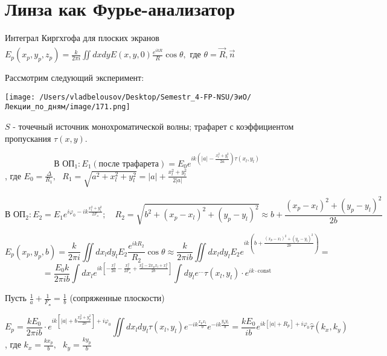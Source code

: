 \documentclass[12pt, a4paper]{report}
\begin{document}
\fi


\section{Линза как Фурье-анализатор}

Интеграл Киргхгофа для плоских экранов \( \displaystyle  E_p (x_p , y_p , z_p ) = \frac{k}{ 2 \pi i } \iint dx dy E(x, y , 0 ) \frac{e^{ i k R } }{R } \cos  \theta  ,    \) \( \text{где } \theta = \widehat{\vec{R }  ,\vec{n } }  \) 

Рассмотрим следующий эксперимент: 

\begin{center}
    \texttt{[image: /Users/vladbelousov/Desktop/Semestr\_4-FP-NSU/ЭиО/Лекции\_по\_дням/image/171.png]}
\end{center}
\( S \) - точечный источник монохроматической волны; трафарет с коэффициентом пропускания \( \tau (x,y ) \).

\[\text{В ОП}_1 :   E_1(\text{после трафарета} )= E_0 e^{ i k \left(  \left\lvert a  \right\rvert - \frac{ x_l ^2 + y_l ^2 }{2 a }  \right) \tau (x_l , y_l)}  \] 
, где \( E_0 = \displaystyle  \frac{\Delta}{R_1 } , \text{ }  R_1 = \sqrt{a ^2 + x_l ^2 + y_l ^2 } = \left\lvert  a  \right\rvert + \frac{ x_l ^2 + y_l ^2 }{2 \left\lvert a \right\rvert}  \) 

\[ \text{В ОП}_2 : E_2 = E_1 e^{ i \varphi_0 -   ik\frac{ x_l ^2 + y_l ^2       }{2 F_{\text{л} } } }; \quad  R_2 = \sqrt{b ^2 + (x_p - x_l ) ^2 + ( y_p - y_l ) ^2 } \approx b + \frac{ (x_p - x_l ) ^2 + (y_p - y_l ) ^2 }{2 b}       \] 

\[ E_p (x_p, y_p ,b ) = \frac{k}{2 \pi i } \iint d x_l d y_l E_2 \frac{ e ^{ ik R_2 } }{R_2 } \cos  \theta \approx \frac{k}{2 \pi i b } \iint d x_l d y_l E_2 e^{i k \left( b + \frac{ (x_p - x_l ) ^2 + ( y_p - y_l ) ^2 }{2 b}  \right)} =       \] 
\[ = \frac{E_0k}{2 \pi i b } \int   d x_l e^{ ik \left[ - \frac{ x_l ^2 }{2 a } - \frac{ x_l ^2 }{2 F_{\text{л} } }  + \frac{x_p ^2 - 2 x_p x_l + x_l ^2 }{2 b }    \right]} \int d y_l e ^{ ...} \tau(x_l , y_l)  \cdot e^{ ik \cdot \mathrm{const}  }  \]  

Пусть  \( \displaystyle  \frac{1}{a }  + \frac{1}{F_{\text{л} } } = \frac{1}{b}   \) (сопряженные плоскости) 

\[ E_p = \frac{ k E_0 }{2 \pi i b } \cdot e^{ ik \left[ \left\lvert a  \right\rvert  + b  \frac{ x_p ^2 + y_p ^2  }{2 b } \right] + i \varphi_0} \iint d x_l d y_l \tau(x_l , y_l) e^{ - ik \frac{ x_p x_l }{b } } e^{- ik \frac{ y_p y_l }{b} } = \frac{k E_0 }{ i b } e^{ ik \left[ \left\lvert a  \right\rvert + R_p  \right] + i \varphi_0 } \hat{ \tau } (k_x , k_y)        \] 
, где \( k_x = \displaystyle \frac{k x_p }{b } , \text{ }  k_y = \frac{ k y_p }{b}   \) 
\end{document}

